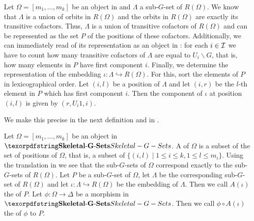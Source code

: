 \begin{rem}\label{rem:representation_of_sub_G_sets}
Let $\Omega = [m_1,\dots,m_k]$ be an object in \SkeletalGSets{} and $\Lambda$ a sub-$G$-set of $R(\Omega)$. We know that $\Lambda$ is a union of orbits in $R(\Omega)$ and the orbits in $R(\Omega)$ are exactly its transitive cofactors. Thus, $\Lambda$ is a union of transitive cofactors of $R(\Omega)$ and can be represented as the set $P$ of the positions of these cofactors. Additionally, we can immediately read of its representation as an object in \SkeletalGSets{}: for each $i \in \mathcal{I}$ we have to count how many transitive cofactors of $\Lambda$ are equal to $U_i \backslash G$, that is, how many elements in $P$ have first component $i$. Finally, we determine the representation of the embedding $\iota\colon \Lambda \hookrightarrow R(\Omega)$. For this, sort the elements of $P$ in lexicographical order. Let $(i,l)$ be a position of $\Lambda$ and let $(i,r)$ be the $l$-th element in $P$ which has first component $i$. Then the component of $\iota$ at position $(i,l)$ is given by $(r,U_i1,i)$.

We make this precise in the next definition and in .
\end{rem}

\begin{defn}
Let $\Omega = [m_1,\dots,m_k]$ be an object in $\SkeletalGSets$. A  of $\Omega$ is a subset of the set of positions of $\Omega$, that is, a subset of $\{ (i,l) \mid 1 \leq i \leq k, 1 \leq l \leq m_i \}$. Using the translation in  we see that the sub-$G$-sets of $\Omega$ correspond exactly to the sub-$G$-sets of $R(\Omega)$. Let $P$ be a sub-$G$-set of $\Omega$, let $\Lambda$ be the corresponding sub-$G$-set of $R(\Omega)$ and let $\iota\colon \Lambda \hookrightarrow R(\Omega)$ be the embedding of $\Lambda$. Then we call $A(\iota)$ the  of $P$. Let $\phi \colon \Omega \to \Delta$ be a morphism in $\SkeletalGSets$. Then we call $\phi \circ A(\iota)$ the  of $\phi$ to $P$.
\end{defn}

